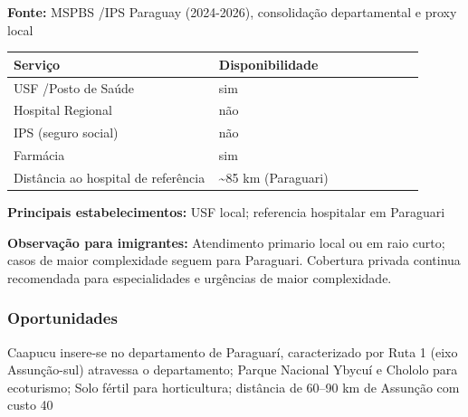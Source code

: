 \textbf{Fonte:} MSPBS /\allowbreak  IPS Paraguay (2024-2026), consolidação
departamental e proxy local

{\def\LTcaptype{none} %
\begin{longtable}{@{}>{\raggedright\arraybackslash}p{0.45\linewidth} >{\raggedright\arraybackslash}p{0.45\linewidth}@{}}
\toprule\noalign{}
Serviço & Disponibilidade \\
\midrule\noalign{}
\endhead
\bottomrule\noalign{}
\endlastfoot
USF /\allowbreak  Posto de Saúde & sim \\
Hospital Regional & não \\
IPS (seguro social) & não \\
Farmácia & sim \\
Distância ao hospital de referência & \textasciitilde85 km
(Paraguari) \\
\end{longtable}
}

\textbf{Principais estabelecimentos:} USF local; referencia hospitalar
em Paraguari

\textbf{Observação para imigrantes:} Atendimento primario local ou em
raio curto; casos de maior complexidade seguem para Paraguari. Cobertura
privada continua recomendada para especialidades e urgências de maior
complexidade.
\newpage

\subsubsection*{Oportunidades}\label{oport-caapucu-0903}
Caapucu insere-se no departamento de Paraguarí, caracterizado por Ruta 1 (eixo Assunção-sul) atravessa o departamento; Parque Nacional Ybycuí e Chololo para ecoturismo; Solo fértil para horticultura; distância de 60–90 km de Assunção com custo 40%


